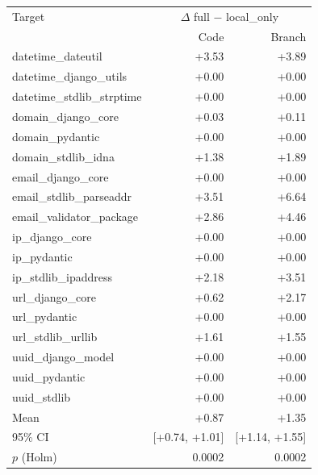 \begin{tabular}{lrr}
\toprule
Target & \multicolumn{2}{c}{$\Delta$ full $-$ local\_only} \\
 & Code & Branch \\
\midrule
datetime\_dateutil & +3.53 & +3.89 \\
datetime\_django\_utils & +0.00 & +0.00 \\
datetime\_stdlib\_strptime & +0.00 & +0.00 \\
domain\_django\_core & +0.03 & +0.11 \\
domain\_pydantic & +0.00 & +0.00 \\
domain\_stdlib\_idna & +1.38 & +1.89 \\
email\_django\_core & +0.00 & +0.00 \\
email\_stdlib\_parseaddr & +3.51 & +6.64 \\
email\_validator\_package & +2.86 & +4.46 \\
ip\_django\_core & +0.00 & +0.00 \\
ip\_pydantic & +0.00 & +0.00 \\
ip\_stdlib\_ipaddress & +2.18 & +3.51 \\
url\_django\_core & +0.62 & +2.17 \\
url\_pydantic & +0.00 & +0.00 \\
url\_stdlib\_urllib & +1.61 & +1.55 \\
uuid\_django\_model & +0.00 & +0.00 \\
uuid\_pydantic & +0.00 & +0.00 \\
uuid\_stdlib & +0.00 & +0.00 \\
\midrule
Mean & +0.87 & +1.35 \\
95\% CI & [+0.74, +1.01] & [+1.14, +1.55] \\
$p$ (Holm) & 0.0002 & 0.0002 \\
\bottomrule
\end{tabular}
